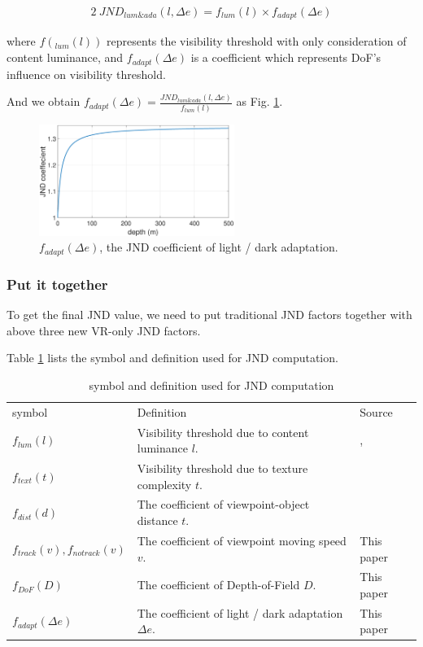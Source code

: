 \begin{alignat}{2}\
JND_{lum\&ada}(l, \Delta e) = f_{lum}(l) \times f_{adapt}(\Delta e)
\end{alignat}

where $f(_{lum}(l))$ represents the visibility threshold with only consideration of content luminance, and $f_{adapt}(\Delta e)$ is a coefficient which represents DoF's influence on visibility threshold.

And we obtain $f_{adapt}(\Delta e) = \frac{JND_{lum\&ada}(l, \Delta e)}{f_{lum}(l)}$ as Fig. \ref{JNDadapt}.

\begin{figure}
  \centering
  \includegraphics[width=2.5in]{images/JNDdof.eps}
  \caption{$f_{adapt}(\Delta e)$, the JND coefficient of light / dark adaptation.}
  \label{JNDadapt}
  \end{figure}

\subsubsection{Put it together}

To get the final JND value, we need to put traditional JND factors together with above three new VR-only JND factors. 

Table \ref{table2} lists the symbol and definition used for JND computation.

\begin{table}[h]
\centering
\caption{symbol and definition used for JND computation}\label{table2}
\begin{tabular}{|p{1.5cm}|p{4cm}|p{1.5cm}|}
\hline
symbol & Definition & Source\\
$f_{lum}(l)$ & Visibility threshold due to content luminance $l$. & \cite{PSPNR}, \cite{luminance1}\\
$f_{text}(t)$ & Visibility threshold due to texture complexity $t$. & \cite{PSPNR}\\
$f_{dist}(d)$ & The coefficient of viewpoint-object distance $t$. & \cite{distance}\\
$f_{track}(v), f_{notrack}(v)$ & The coefficient of viewpoint moving speed $v$. & This paper\\
$f_{DoF}(D)$ & The coefficient of Depth-of-Field $D$. & This paper\\
$f_{adapt}(\Delta e)$ & The coefficient of light / dark adaptation $\Delta e$. & This paper\\
\hline
\end{tabular}
\end{table}

